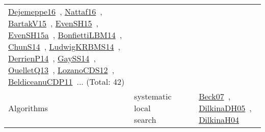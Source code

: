 {\begin{longtable}{lp{3cm}>{\raggedright\arraybackslash}p{6cm}>{\raggedright\arraybackslash}p{6cm}>{\raggedright\arraybackslash}p{8cm}}
\href{../works/Dejemeppe16.pdf}{Dejemeppe16}~\cite{Dejemeppe16}, \href{../works/Nattaf16.pdf}{Nattaf16}~\cite{Nattaf16}, \href{../works/BartakV15.pdf}{BartakV15}~\cite{BartakV15}, \href{../works/EvenSH15.pdf}{EvenSH15}~\cite{EvenSH15}, \href{../works/EvenSH15a.pdf}{EvenSH15a}~\cite{EvenSH15a}, \href{../works/BonfiettiLBM14.pdf}{BonfiettiLBM14}~\cite{BonfiettiLBM14}, \href{../works/ChunS14.pdf}{ChunS14}~\cite{ChunS14}, \href{../works/LudwigKRBMS14.pdf}{LudwigKRBMS14}~\cite{LudwigKRBMS14}, \href{../works/DerrienP14.pdf}{DerrienP14}~\cite{DerrienP14}, \href{../works/GaySS14.pdf}{GaySS14}~\cite{GaySS14}, \href{../works/OuelletQ13.pdf}{OuelletQ13}~\cite{OuelletQ13}, \href{../works/LozanoCDS12.pdf}{LozanoCDS12}~\cite{LozanoCDS12}, \href{../works/BeldiceanuCDP11.pdf}{BeldiceanuCDP11}~\cite{BeldiceanuCDP11}... (Total: 42)\\
\index{systematic local search}\index{Algorithms!systematic local search}Algorithms & systematic local search &  &  & \href{../works/Beck07.pdf}{Beck07}~\cite{Beck07}, \href{../works/DilkinaDH05.pdf}{DilkinaDH05}~\cite{DilkinaDH05}, \href{../works/DilkinaH04.pdf}{DilkinaH04}~\cite{DilkinaH04}\\

\end{longtable}}
